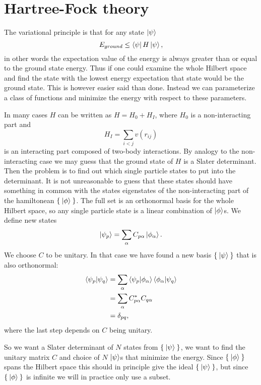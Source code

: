 \documentclass[a4paper,english,12pt]{article}
\newcommand{\be}{\begin{equation}}
\newcommand{\ee}{\end{equation}}
\begin{document}
\section{Hartree-Fock theory}


The variational principle is that for any state $\ket{\psi}$
\be\label{var}
E_{ground}\leq \bra{\psi}H\ket{\psi},
\ee
in other words the expectation value of the energy is always greater than or equal to the ground state energy.\cite{simen}
Thus if one could examine the whole Hilbert space and find the state with the lowest energy expectation that state would be the ground state.
This is however easier said than done. Instead we can parameterize a class of functions and minimize the energy with respect to these parameters.

In many cases $H$ can be written as $H = H_0 + H_I$, where $H_0$ is a non-interacting part and
\[H_I =\sum_{i<j}v(r_{ij})\]
is an interacting part composed of two-body interactions.
By analogy to the non-interacting case we may guess that the ground state of $H$ is a Slater determinant. Then the problem is to find out which
single particle states to put into the determinant. It is not unreasonable to guess that these states should have something in common with
the states eigenstates of the non-interacting part of the hamiltonean \(\Set{\Ket{\phi}}\). The full set is an orthonormal basis for the whole Hilbert space,
so any single particle state is a linear combination of $\ket{\phi}$s. We define new states
\be  \ket{\psi_p} = \sum_\alpha C_{p\alpha}\ket{\phi_\alpha}.\ee
We choose $C$ to be unitary. In that case we have found a new basis \(\Set{\Ket{\psi}}\) that is also orthonormal:
\begin{align*}
  \braket{\psi_p|\psi_q} &= \sum_\alpha\braket{\psi_p|\phi_\alpha}\braket{\phi_\alpha|\psi_q}\\
  &=\sum_{\alpha}C_{p\alpha}^*C_{q\alpha}\\
  &=\delta_{pq},
\end{align*}  
where the last step depends on $C$ being unitary.

So we want a Slater determinant of $N$ states from \(\Set{\Ket{\psi}}\), we want to find the unitary matrix $C$ and choice of $N$ $\ket{\psi}$s that minimize the
energy. Since \(\Set{\Ket{\phi}}\) spans the Hilbert space this should in principle give the ideal \(\Set{\Ket{\psi}}\), but since \(\Set{\Ket{\phi}}\)
is infinite we will in practice only use a subset.
\end{document}
